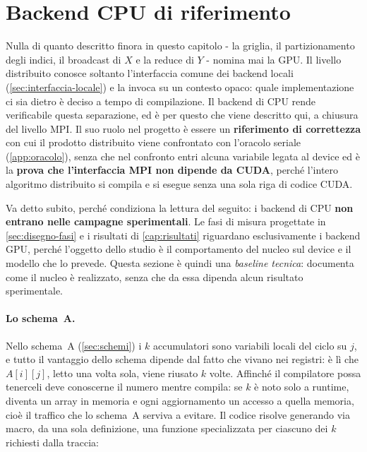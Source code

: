 \section{Backend CPU di riferimento}
\label{sec:backend-cpu}

Nulla di quanto descritto finora in questo capitolo - la griglia, il
partizionamento degli indici, il broadcast di $X$ e la reduce di $Y$ - nomina
mai la GPU. Il livello distribuito conosce soltanto l'interfaccia comune dei
backend locali (\cref{sec:interfaccia-locale}) e la invoca su un contesto
opaco: quale implementazione ci sia dietro è deciso a tempo di compilazione. Il
backend di CPU rende verificabile questa separazione, ed è per questo che viene
descritto qui, a chiusura del livello MPI. Il suo ruolo nel progetto è essere un
\textbf{riferimento di correttezza} con cui il prodotto distribuito viene
confrontato con l'oracolo seriale (\cref{app:oracolo}), senza che nel confronto
entri alcuna variabile legata al device ed è la \textbf{prova che l'interfaccia
MPI non dipende da CUDA}, perché l'intero algoritmo distribuito si compila e si
esegue senza una sola riga di codice CUDA.

Va detto subito, perché condiziona la lettura del seguito: i backend di CPU
\textbf{non entrano nelle campagne sperimentali}. Le fasi di misura progettate
in \cref{sec:disegno-fasi} e i risultati di \cref{cap:risultati} riguardano
esclusivamente i backend GPU, perché l'oggetto dello studio è il comportamento
del nucleo sul device e il modello che lo prevede. Questa sezione è quindi una
\emph{baseline tecnica}: documenta come il nucleo è realizzato,
senza che da essa dipenda alcun risultato sperimentale.

\paragraph{Lo schema~A.}
Nello schema~A (\cref{sec:schemi}) i
$k$ accumulatori sono variabili locali del ciclo su $j$, e tutto il vantaggio
dello schema dipende dal fatto che vivano nei registri: è lì che $A[i][j]$,
letto una volta sola, viene riusato $k$ volte. Affinché il compilatore possa
tenerceli deve conoscerne il numero mentre compila: se $k$ è noto solo a
runtime,  diventa un array in memoria e ogni aggiornamento un accesso
a quella memoria, cioè il traffico che lo schema~A serviva a evitare. Il codice
risolve generando via macro, da una sola definizione, una funzione
specializzata per ciascuno dei $k$ richiesti dalla traccia:

